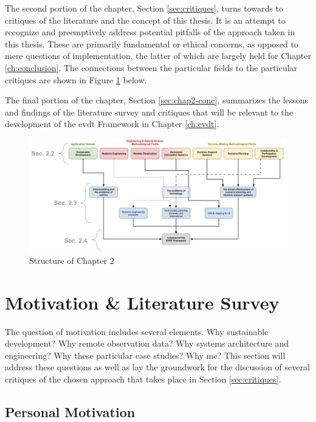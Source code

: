 The second portion of the chapter, Section \ref{sec:critiques}, turns towards to critiques of the literature and the concept of this thesis. It is an attempt to recognize and preemptively address potential pitfalls of the approach taken in this thesis. These are primarily fundamental or ethical concerns, as opposed to mere questions of implementation, the latter of which are largely held for Chapter \ref{ch:conclusion}. The connections between the particular fields to the particular critiques are shown in Figure \ref{fig:lit_survey_structure} below.

The final portion of the chapter, Section \ref{sec:chap2-conc}, summarizes the lessons and findings of the literature survey and critiques that will be relevant to the development of the \ac{evdt} Framework in Chapter \ref{ch:evdt}.

\begin{landscape}
\begin{figure}[t]
	\centering
	\includegraphics[scale=0.3]{Figures/chap2/lit_survey_structure.png}
	\caption[Structure of Chapter 2]{Structure of Chapter 2}
	\label{fig:lit_survey_structure}
\end{figure}
\end{landscape}

\section{Motivation \& Literature Survey} \label{sec:motivation}

The question of motivation includes several elements. Why sustainable development? Why remote observation data? Why systems architecture and engineering? Why these particular case studies? Why me? This section will address these questions as well as lay the groundwork for the discussion of several critiques of the chosen approach that takes place in Section \ref{sec:critiques}.

\subsection{Personal Motivation}

